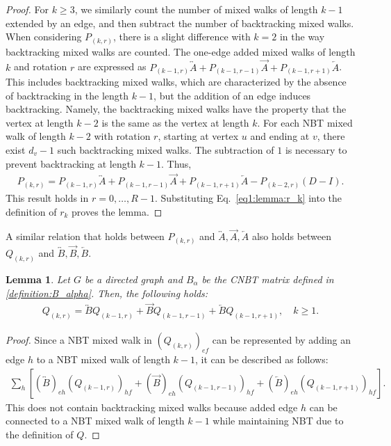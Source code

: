\documentclass{article}
\theoremstyle{plain}
\newtheorem{lemma}{Lemma}
\begin{document}
\begin{proof}
	For $k \geq 3$, we similarly count the number of mixed walks of length $k-1$ extended by an edge, and then subtract the number of backtracking mixed walks. When considering $P_{(k,r)}$, there is a slight difference with $k=2$ in the way backtracking mixed walks are counted. The one-edge added mixed walks of length $k$ and rotation $r$ are expressed as $P_{(k-1,r)} \overleftrightarrow{A} + P_{(k-1,r-1)} \overrightarrow{A} + P_{(k-1,r+1)} \overleftarrow{A}$.
	This includes backtracking mixed walks, which are characterized by the absence of backtracking in the length $k-1$, but the addition of an edge induces backtracking.
	Namely, the backtracking mixed walks have the property that the vertex at length $k-2$ is the same as the vertex at length $k$.
	For each NBT mixed walk of length $k-2$ with rotation $r$, starting at vertex $u$ and ending at $v$, there exist $d_v-1$ such backtracking mixed walks. The subtraction of $1$ is necessary to prevent backtracking at length $k-1$. Thus,
	\begin{align}
		P_{(k,r)} = P_{(k-1,r)} \overleftrightarrow{A} + P_{(k-1,r-1)} \overrightarrow{A} + P_{(k-1,r+1)} \overleftarrow{A} - P_{(k-2,r)} (D - I)
		.\label{eq1:lemma:r_k}
	\end{align}
	This result holds in $r=0,\dots, R-1$.
	Substituting Eq.~\eqref{eq1:lemma:r_k} into the definition of $r_k$ proves the lemma.
\end{proof}

A similar relation that holds between $P_{(k,r)}$ and $\overleftrightarrow{A}, \overrightarrow{A}, \overleftarrow{A}$ also holds between $Q_{(k,r)}$ and $\overleftrightarrow{B}, \overrightarrow{B}, \overleftarrow{B}$.
\begin{lemma}\label{lemma:basic2}
	Let $G$ be a directed graph and $B_{\alpha}$ be the CNBT matrix defined in \eqref{definition:B_alpha}. Then, the following holds:
	\begin{align*}
		Q_{(k,r)} =
		\overleftrightarrow{B} Q_{(k-1,r)}
		+ \overrightarrow{B} Q_{(k-1,r-1)}
		+ \overleftarrow{B} Q_{(k-1,r+1)}
		,\quad
		k\geq 1
		.
	\end{align*}
\end{lemma}

\begin{proof}
	Since a NBT mixed walk in $( Q_{(k,r)} )_{ef}$ can be represented by adding an edge $h$ to a NBT mixed walk of length $k-1$, it can be described as follows:
	\begin{align*}
		\sum_{h} \left[
			( \overleftrightarrow{B} )_{eh} ( Q_{(k-1,r)} )_{hf}
			+ ( \overrightarrow{B} )_{eh} ( Q_{(k-1,r-1)} )_{hf}
			+ ( \overleftarrow{B} )_{eh} ( Q_{(k-1,r+1)} )_{hf}
			\right]
		.
	\end{align*}
	This does not contain backtracking mixed walks because added edge $h$ can be connected to a NBT mixed walk of length $k-1$ while maintaining NBT due to the definition of $Q$.
\end{proof}
\end{document}
